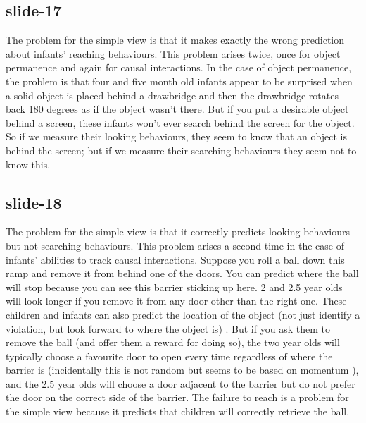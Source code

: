 \documentclass[12pt,\papersize]{extarticle}
\begin{document}
 
\subsection{slide-17}
The problem for the simple view is that it makes exactly the wrong prediction about infants' reaching behaviours.
This problem arises twice, once for object permanence and again for causal interactions.
In the case of object permanence, the problem is that four and five month old infants appear to be surprised when a solid object is placed behind a drawbridge and then the drawbridge rotates back 180 degrees as if the object wasn't there. But if you put a desirable object behind a screen, these infants won't ever search behind the screen for the object. So if we measure their looking behaviours, they seem to know that an object is behind the screen; but if we measure their searching behaviours they seem not to know this.
 
 
\subsection{slide-18}
The problem for the simple view is that it correctly predicts looking behaviours but not searching behaviours.
This problem arises a second time in the case of infants' abilities to track causal interactions.
Suppose you roll a ball down this ramp and remove it from behind one of the doors.
You can predict where the ball will stop because you can see this barrier sticking up here.
2 and 2.5 year olds will look longer if you remove it from any door other than the right one.
These children and infants can also predict the location of the object (not just identify a violation, but look forward to where the object is) \citep{mash:2006_what}.
But if you ask them to remove the ball (and offer them a reward for doing so), the two year olds will typically choose a favourite door to open every time regardless of where the barrier is (incidentally this is not random but seems to be based on momentum \citep{perry:2008_representational}), and the 2.5 year olds will choose a door adjacent to the barrier but do not prefer the door on the correct side of the barrier.
The failure to reach is a problem for the simple view because it predicts that children will correctly retrieve the ball.
 
 
\end{document}
